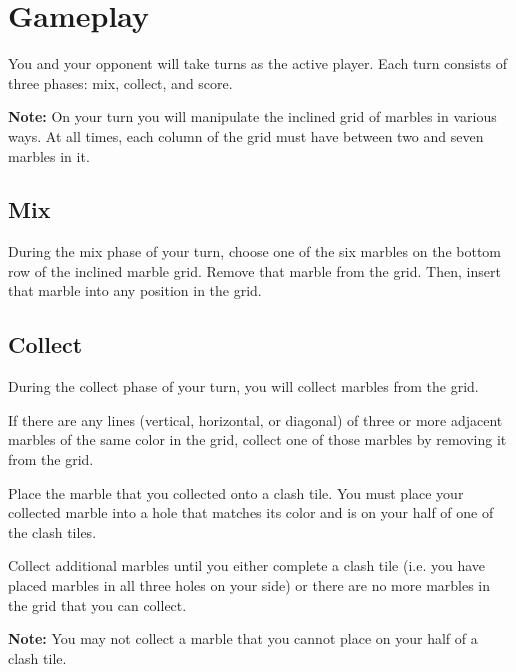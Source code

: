 \section*{Gameplay}
You and your opponent will take turns as the active player.
Each turn consists of three phases: mix, collect, and score.

\textbf{Note:} On your turn you will manipulate the inclined grid of marbles in various ways.
At all times, each column of the grid must have between two and seven marbles in it.

\subsection*{Mix}
During the mix phase of your turn, choose one of the six marbles on the bottom row of the inclined marble grid.
Remove that marble from the grid. Then, insert that marble into any position in the grid.

%

\newpage

\subsection*{Collect}
During the collect phase of your turn, you will collect marbles from the grid.

If there are any lines (vertical, horizontal, or diagonal) of three or more adjacent marbles of the same color in the grid, collect one of those marbles by removing it from the grid.

Place the marble that you collected onto a clash tile.
You must place your collected marble into a hole that matches its color and is on your half of one of the clash tiles.

Collect additional marbles until you either complete a clash tile (i.e. you have placed marbles in all three holes on your side) or there are no more marbles in the grid that you can collect.


\textbf{Note:} You may not collect a marble that you cannot place on your half of a clash tile.


